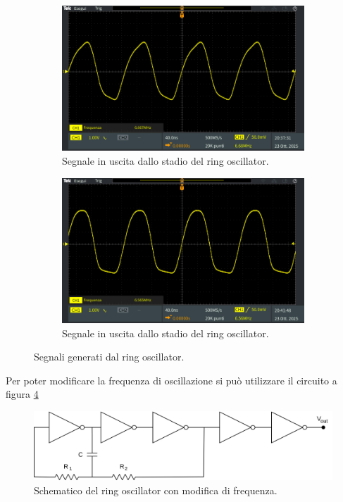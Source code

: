 \documentclass[a4paper,12pt]{article}
\begin{document}
\begin{figure}[h]
	\centering
	\begin{subfigure}{0.45\linewidth}
		\includegraphics[width = \linewidth]{immagini/ring-oscillator/ring-oscillator-oscillatore.png}
		\caption{Segnale in uscita dallo stadio del ring oscillator.}
		\label{fig:a-oscillatore-ring-oscillator}
	\end{subfigure}
	\quad
	\begin{subfigure}{0.45\linewidth}
		\includegraphics[width = \linewidth]{immagini/ring-oscillator/ring-oscillator-uscita-doppio-inverter-oscillatore.png}
		\caption{Segnale in uscita dallo stadio del ring oscillator.}
		\label{fig:b-oscillatore-ring-oscillator}
	\end{subfigure}
	\caption{Segnali generati dal ring oscillator.}
	\label{fig:oscillatore-ring-oscillator}
\end{figure}

Per poter modificare la frequenza di oscillazione si può utilizzare il circuito a figura \ref{fig:ring-oscillator-schematico-freq} 

\begin{figure}[h]
	\centering
	\includegraphics[width=0.7\linewidth]{immagini/ring-oscillator/3InverteRes.png}
	\caption{Schematico del ring oscillator con modifica di frequenza.}
	\label{fig:ring-oscillator-schematico-freq}
\end{figure}
\end{document}
